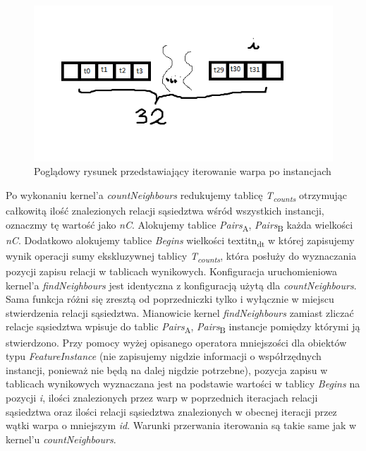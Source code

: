 \documentclass[12pt]{article}
\newcounter{operator}
\begin{document}
\begin{figure}[H]
\centering
\includegraphics{planesweep}
\caption{Poglądowy rysunek przedstawiający iterowanie warpa po instancjach}
\end{figure}

Po wykonaniu kernel'a \textit{countNeighbours} redukujemy tablicę \textit{T\textsubscript{counts}} otrzymując całkowitą ilość znalezionych relacji sąsiedztwa wśród wszystkich instancji, oznaczmy tę wartość jako \textit{nC}. Alokujemy tablice \textit{Pairs}\textsubscript{A}, \textit{Pairs}\textsubscript{B} każda wielkości \textit{nC}. Dodatkowo alokujemy tablice \textit{Begins} wielkości textit{n\textsubscript{dt}} w której zapisujemy wynik operacji sumy ekskluzywnej tablicy \textit{T\textsubscript{counts}}, która posłuży do wyznaczania pozycji zapisu relacji w tablicach wynikowych.
Konfiguracja uruchomieniowa kernel'a \textit{findNeighbours} jest identyczna z konfiguracją użytą dla \textit{countNeighbours}. Sama funkcja różni się zresztą od poprzedniczki tylko i wyłącznie w miejscu stwierdzenia relacji sąsiedztwa. Mianowicie kernel \textit{findNeighbours} zamiast zliczać relacje sąsiedztwa wpisuje do tablic \textit{Pairs}\textsubscript{A}, \textit{Pairs}\textsubscript{B} instancje pomiędzy którymi ją stwierdzono. Przy pomocy wyżej opisanego operatora mniejszości dla obiektów typu \textit{FeatureInstance} (nie zapisujemy nigdzie informacji o współrzędnych instancji, ponieważ nie będą na dalej nigdzie potrzebne), pozycja zapisu w tablicach wynikowych wyznaczana jest na podstawie wartości w tablicy \textit{Begins} na pozycji \textit{i}, ilości znalezionych przez warp w poprzednich iteracjach relacji sąsiedztwa oraz ilości relacji sąsiedztwa znalezionych w obecnej iteracji przez wątki warpa o mniejszym \textit{id}. Warunki przerwania iterowania są takie same jak w kernel'u \textit{countNeighbours}.
\end{document}
